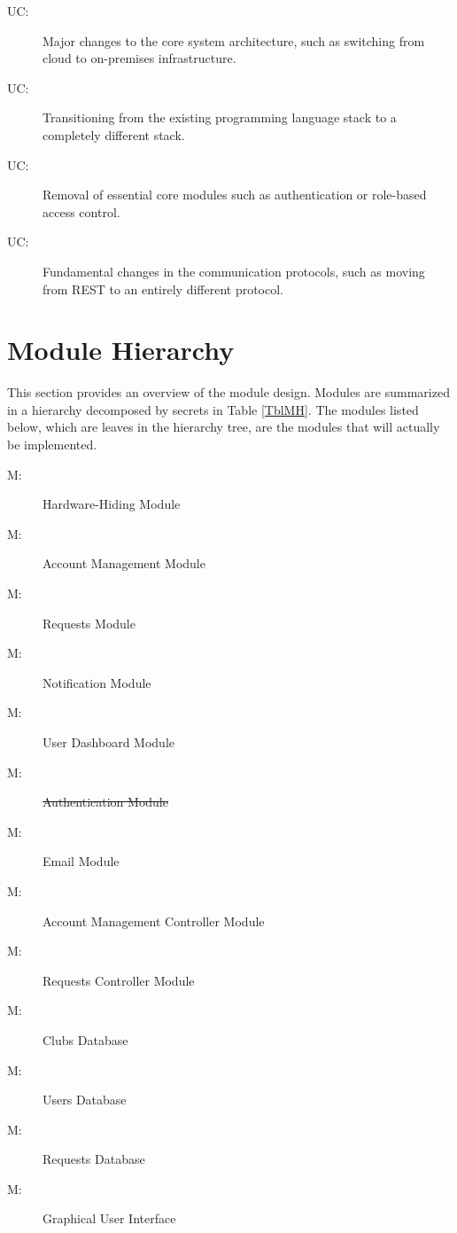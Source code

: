 \documentclass[12pt, titlepage]{article}
\newcounter{ucnum}
\newcommand{\uctheucnum}{UC\theucnum}
\newcounter{mnum}
\newcommand{\mthemnum}{M\themnum}
\begin{document}
\begin{description}
\item[ \uctheucnum \label{ucArchitecture}:] Major changes to the core system architecture, such as switching from cloud to on-premises infrastructure.
\item[ \uctheucnum \label{ucLanguages}:] Transitioning from the existing programming language stack to a completely different stack.
\item[ \uctheucnum \label{ucCoreModules}:] Removal of essential core modules such as authentication or role-based access control.
\item[ \uctheucnum \label{ucProtocols}:] Fundamental changes in the communication protocols, such as moving from REST to an entirely different protocol.
\end{description}

\section{Module Hierarchy} \label{SecMH}

This section provides an overview of the module design. Modules are summarized
in a hierarchy decomposed by secrets in Table \ref{TblMH}. The modules listed
below, which are leaves in the hierarchy tree, are the modules that will
actually be implemented.

\begin{description}
\item [ \mthemnum \label{mHH}:] Hardware-Hiding Module
\item [ \mthemnum \label{mBH1}:] Account Management Module
\item [ \mthemnum \label{mBH2}:] Requests Module
\item [ \mthemnum \label{mBH3}:] Notification Module
\item [ \mthemnum \label{mBH4}:] User Dashboard Module
\item [ \mthemnum \label{mBH5}:] \st{Authentication Module}
\item [ \mthemnum \label{mBH6}:] Email Module
\item [ \mthemnum \label{mBH7}:] Account Management Controller Module
\item [ \mthemnum \label{mBH8}:] Requests Controller Module
\item [ \mthemnum \label{mSD1}:] Clubs Database
\item [ \mthemnum \label{mSD2}:] Users Database
\item [ \mthemnum \label{mSD3}:] Requests Database
\item [ \mthemnum \label{mSD4}:] Graphical User Interface
\end{description}
\end{document}
